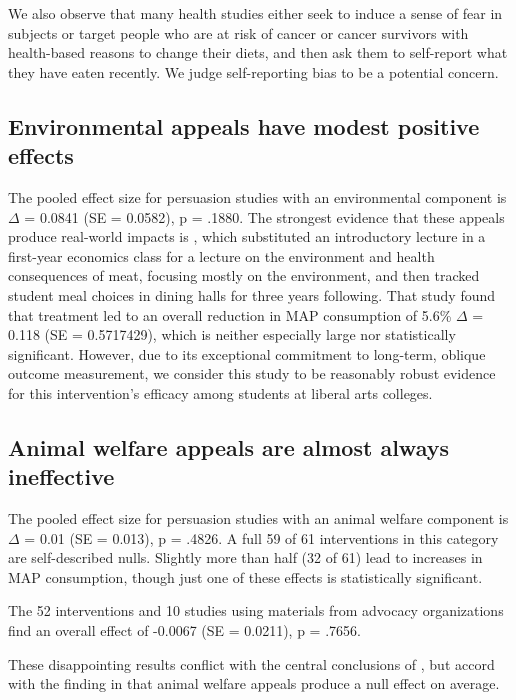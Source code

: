 \documentclass[sn-nature,pdflatex]{sn-jnl}
\begin{document}
We also observe that many health studies either seek to induce a sense
of fear in subjects \citep{berndsen2005} or target people who are at
risk of cancer \citep{hatami2018} or cancer survivors
\citep{james2015, lee2018} with health-based reasons to change their
diets, and then ask them to self-report what they have eaten recently.
We judge self-reporting bias to be a potential concern.

\subsection{Environmental appeals have modest positive
effects}\label{sec2.8}

The pooled effect size for persuasion studies with an environmental
component is \(\Delta\) = 0.0841 (SE = 0.0582), p = .1880. The strongest
evidence that these appeals produce real-world impacts is
\citep{jalil2023}, which substituted an introductory lecture in a
first-year economics class for a lecture on the environment and health
consequences of meat, focusing mostly on the environment, and then
tracked student meal choices in dining halls for three years following.
That study found that treatment led to an overall reduction in MAP
consumption of 5.6\% \(\Delta\) = 0.118 (SE = 0.5717429), which is
neither especially large nor statistically significant. However, due to
its exceptional commitment to long-term, oblique outcome measurement, we
consider this study to be reasonably robust evidence for this
intervention's efficacy among students at liberal arts colleges.

\subsection{Animal welfare appeals are almost always
ineffective}\label{sec2.9}

The pooled effect size for persuasion studies with an animal welfare
component is \(\Delta\) = 0.01 (SE = 0.013), p = .4826. A full 59 of 61
interventions in this category are self-described nulls. Slightly more
than half (32 of 61) lead to increases in MAP consumption, though just
one of these effects is statistically significant.

The 52 interventions and 10 studies using materials from advocacy
organizations find an overall effect of -0.0067 (SE = 0.0211), p =
.7656.

These disappointing results conflict with the central conclusions of
\citep{mathur2021effectiveness}, but accord with the finding in
\citep{DiGennaro2024} that animal welfare appeals produce a null effect
on average.
\end{document}
